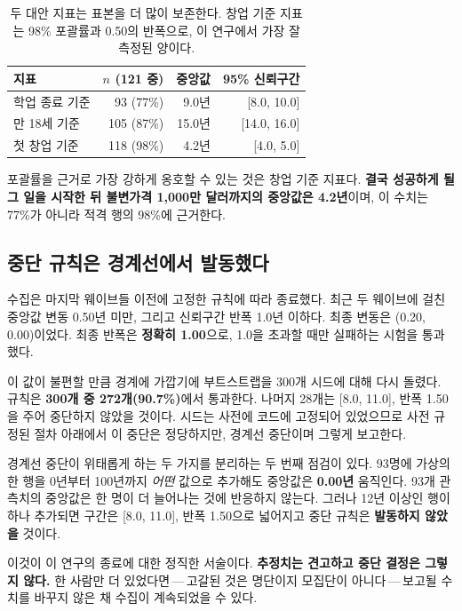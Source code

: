 \documentclass[11pt]{article}
\begin{document}
\begin{table}[h]
\centering
\begin{tabular}{lrrr}
\toprule
지표 & $n$ (121 중) & 중앙값 & 95\% 신뢰구간 \\
\midrule
학업 종료 기준 & 93 (77\%) & 9.0년 & [8.0, 10.0] \\
만 18세 기준 & 105 (87\%) & 15.0년 & [14.0, 16.0] \\
첫 창업 기준 & 118 (98\%) & 4.2년 & [4.0, 5.0] \\
\bottomrule
\end{tabular}
\caption{두 대안 지표는 표본을 더 많이 보존한다. 창업 기준 지표는 98\% 포괄률과
0.50의 반폭으로, 이 연구에서 가장 잘 측정된 양이다.}
\end{table}

포괄률을 근거로 가장 강하게 옹호할 수 있는 것은 창업 기준 지표다. \textbf{결국 성공하게
될 그 일을 시작한 뒤 불변가격 1{,}000만 달러까지의 중앙값은 4.2년}이며, 이 수치는
77\%가 아니라 적격 행의 98\%에 근거한다.

\subsection{중단 규칙은 경계선에서 발동했다}

수집은 마지막 웨이브들 이전에 고정한 규칙에 따라 종료했다. 최근 두 웨이브에 걸친 중앙값
변동 0.50년 미만, 그리고 신뢰구간 반폭 1.0년 이하다. 최종 변동은 (0.20, 0.00)이었다.
최종 반폭은 \textbf{정확히 1.00}으로, 1.0을 초과할 때만 실패하는 시험을 통과했다.

이 값이 불편할 만큼 경계에 가깝기에 부트스트랩을 300개 시드에 대해 다시 돌렸다. 규칙은
\textbf{300개 중 272개(90.7\%)}에서 통과한다. 나머지 28개는 [8.0, 11.0], 반폭 1.50을
주어 중단하지 않았을 것이다. 시드는 사전에 코드에 고정되어 있었으므로 사전 규정된 절차
아래에서 이 중단은 정당하지만, 경계선 중단이며 그렇게 보고한다.

경계선 중단이 위태롭게 하는 두 가지를 분리하는 두 번째 점검이 있다. 93명에 가상의 한 행을
0년부터 100년까지 \emph{어떤} 값으로 추가해도 중앙값은 \textbf{0.00년} 움직인다. 93개
관측치의 중앙값은 한 명이 더 늘어나는 것에 반응하지 않는다. 그러나 12년 이상인 행이 하나
추가되면 구간은 [8.0, 11.0], 반폭 1.50으로 넓어지고 중단 규칙은 \textbf{발동하지 않았을}
것이다.

이것이 이 연구의 종료에 대한 정직한 서술이다. \textbf{추정치는 견고하고 중단 결정은 그렇지
않다.} 한 사람만 더 있었다면\,---\,고갈된 것은 명단이지 모집단이 아니다\,---\,보고될 수치를
바꾸지 않은 채 수집이 계속되었을 수 있다.
\end{document}
